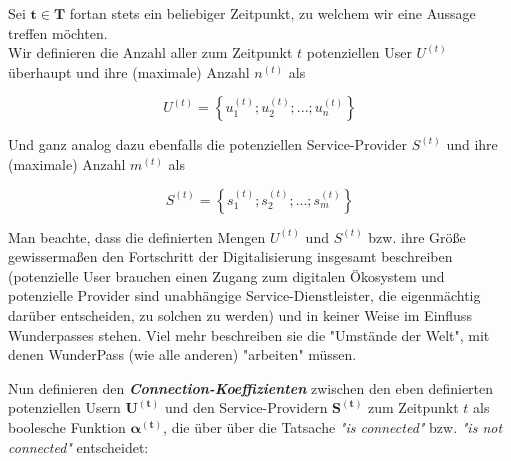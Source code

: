 Sei $\mathbf{t \in T}$ fortan stets ein beliebiger Zeitpunkt, zu welchem wir eine Aussage treffen möchten. \\


Wir definieren die Anzahl aller zum Zeitpunkt $t$ potenziellen User $U^{(t)}$ überhaupt und ihre (maximale) Anzahl $n^{(t)}$ als \\

\begin{Def}\label{defU}
\begin{equation*}
  U^{(t)} = \left\{ u^{(t)}_1; u^{(t)}_2;...; u^{(t)}_{n} \right\}
\end{equation*}
\end{Def} 

\vspace{0.3cm}


Und ganz analog dazu ebenfalls die potenziellen Service-Provider $S^{(t)}$ und ihre (maximale) Anzahl $m^{(t)}$ als \\

\begin{Def}\label{defS}
\begin{equation*}
  S^{(t)} = \left\{ s^{(t)}_1; s^{(t)}_2;...; s^{(t)}_{m}\right\}
\end{equation*}
\end{Def}

\vspace{0.3cm}

Man beachte, dass die definierten Mengen $U^{(t)}$ und $S^{(t)}$ bzw. ihre Größe gewissermaßen den Fortschritt der Digitalisierung insgesamt beschreiben (potenzielle User brauchen einen Zugang zum digitalen Ökosystem und potenzielle Provider sind unabhängige Service-Dienstleister, die eigenmächtig darüber entscheiden, zu solchen zu werden) und in keiner Weise im Einfluss Wunderpasses stehen. Viel mehr beschreiben sie die "Umstände der Welt", mit denen WunderPass (wie alle anderen) "arbeiten" müssen.  

\vspace{1cm}


Nun definieren den \textbf{\textit{Connection-Koeffizienten}} zwischen den eben definierten potenziellen Usern $\mathbf{U^{(t)}}$ und den Service-Providern $\mathbf{S^{(t)}}$ zum Zeitpunkt $t$ als boolesche Funktion $\mathbf{\alpha^{(t)}}$, die über über die Tatsache \textit{"is connected"} bzw. \textit{"is not connected"} entscheidet: \\

